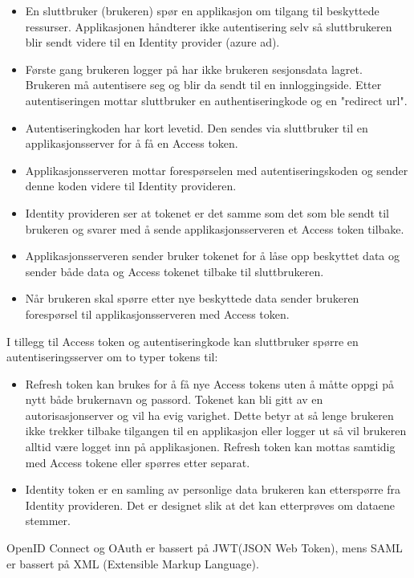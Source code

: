 \begin{itemize}
\item En sluttbruker (brukeren) spør en applikasjon om tilgang til beskyttede ressurser. Applikasjonen håndterer ikke autentisering selv så sluttbrukeren blir sendt videre til en Identity provider (azure ad). 
\item Første gang brukeren logger på har ikke brukeren sesjonsdata lagret. Brukeren må autentisere seg og blir da sendt til en innloggingside. Etter autentiseringen mottar sluttbruker en authentiseringkode og en "redirect url". 
\item Autentiseringkoden har kort levetid. Den sendes via sluttbruker til en applikasjonsserver for å få en Access token. 
\item Applikasjonsserveren mottar forespørselen med autentiseringskoden og sender denne koden videre til Identity provideren. 
\item Identity provideren ser at tokenet er det samme som det som ble sendt til brukeren og svarer med å sende applikasjonsserveren et Access token tilbake.
\item Applikasjonsserveren sender bruker tokenet for å låse opp beskyttet data og sender både data og Access tokenet tilbake til sluttbrukeren.
\item Når brukeren skal spørre etter nye beskyttede data sender brukeren forespørsel til applikasjonsserveren med Access token.
\end{itemize}

I tillegg til Access token og autentiseringkode kan sluttbruker spørre en autentiseringsserver om to typer tokens til:
\begin{itemize}
\item Refresh token kan brukes for å få nye Access tokens uten å måtte oppgi på nytt både brukernavn og passord. Tokenet kan bli gitt av en autorisasjonserver og vil ha evig varighet. Dette betyr at så lenge brukeren ikke trekker tilbake tilgangen til en applikasjon eller logger ut så vil brukeren alltid være logget inn på applikasjonen. Refresh token kan mottas samtidig med Access tokene eller spørres etter separat.
\item Identity token er en samling av personlige data brukeren kan etterspørre fra Identity provideren. Det er designet slik at det kan etterprøves om dataene stemmer.
\end{itemize}

OpenID Connect og OAuth er bassert på JWT(JSON Web Token), mens SAML er bassert på XML (Extensible Markup Language).

